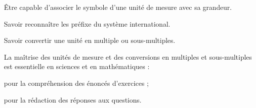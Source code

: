 \teteSndAP


\begin{objectifs}
  \item Être capable d'associer le symbole d'une unité de mesure avec sa grandeur.
  \item Savoir reconnaître les préfixe du système international.
  \item Savoir convertir une unité en multiple ou sous-multiples.
\end{objectifs}

\begin{contexte}  
  La maîtrise des unités de mesure et des conversions en multiples et sous-multiples est essentielle en
  sciences et en mathématiques :
  \begin{listePoints}
    \item pour la compréhension des énoncés d’exercices ;
    \item pour la rédaction des réponses aux questions.
  \end{listePoints}
\end{contexte}

